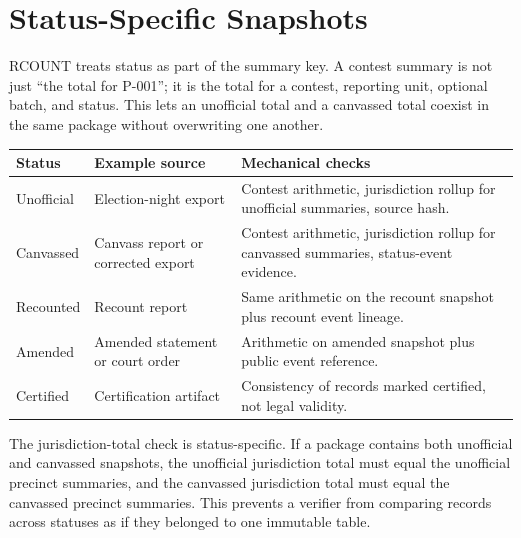 \section{Status-Specific Snapshots}

RCOUNT treats status as part of the summary key. A contest summary is not just
``the total for P-001''; it is the total for a contest, reporting unit, optional
batch, and status. This lets an unofficial total and a canvassed total coexist
in the same package without overwriting one another.

\begin{center}
\small
\begin{tabularx}{\textwidth}{lXX}
\toprule
Status & Example source & Mechanical checks \\
\midrule
Unofficial & Election-night export & Contest arithmetic, jurisdiction rollup for unofficial summaries, source hash. \\
Canvassed & Canvass report or corrected export & Contest arithmetic, jurisdiction rollup for canvassed summaries, status-event evidence. \\
Recounted & Recount report & Same arithmetic on the recount snapshot plus recount event lineage. \\
Amended & Amended statement or court order & Arithmetic on amended snapshot plus public event reference. \\
Certified & Certification artifact & Consistency of records marked certified, not legal validity. \\
\bottomrule
\end{tabularx}
\end{center}

The jurisdiction-total check is status-specific. If a package contains both
unofficial and canvassed snapshots, the unofficial jurisdiction total must equal
the unofficial precinct summaries, and the canvassed jurisdiction total must
equal the canvassed precinct summaries. This prevents a verifier from comparing
records across statuses as if they belonged to one immutable table.

